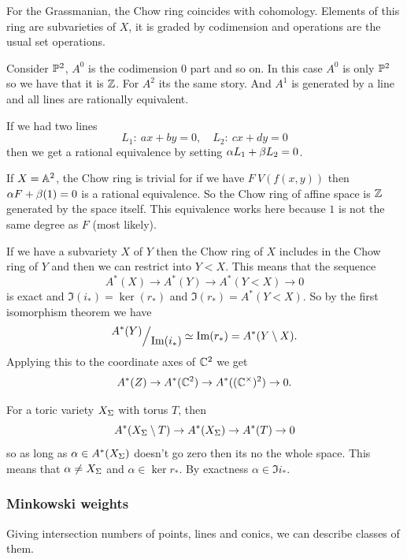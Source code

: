 \documentclass[12pt]{memoir}
\theoremstyle{definition}
\def\al{\alpha}
\begin{document}
For the Grassmanian, the Chow ring coincides with cohomology. Elements of this ring are subvarieties of $X$, it is graded by codimension and operations are the usual set operations.

\begin{Ex}
    Consider $\mathbb{P}^2$, $A^0$ is the codimension 0 part and so on. In this case $A^0$ is only $\mathbb{P}^2$ so we have that it is $\mathbb{Z}$. For $A^2$ its the same story. And $A^1$ is generated by a line and all lines are rationally equivalent.\par 
    If we had two lines 
    $$L_1:\ ax+by=0,\quad L_2:\ cx+dy=0$$
    then we get a rational equivalence by setting $\al L_1+\bt L_2=0$.
\end{Ex}

\begin{Ex}
    If $X=\mathbb{A}^2$, the Chow ring is trivial for if we have $F\: V(f(x,y))$ then $\al F+\bt(1)=0$ is a rational equivalence. So the Chow ring of affine space is $\mathbb{Z}$ generated by the space itself. This equivalence works here because $1$ is not the same degree as $F$ (most likely).
\end{Ex}

\begin{Ex}
    If we have a subvariety $X$ of $Y$ then the Chow ring of $X$ includes in the Chow ring of $Y$ and then we can restrict into $Y\less X$. This means that the sequence 
    $$A^*(X)\to A^*(Y)\to A^*(Y\less X)\to 0$$
    is exact and $\Im(i_\ast)=\ker(r_\ast)$ and $\Im(r_\ast)=A^\ast(Y\less X)$. So by the first isomorphism theorem we have 
    $$\quot{A^\ast(Y)}{\Im(i_\ast)}\isom \Im(r_\ast)=A^\ast(Y\less X).$$
    Applying this to the coordinate axes of $\mathbb{C}^2$ we get
    $$A^\ast(Z)\to A^\ast(\mathbb{C}^2)\to A^\ast((\mathbb{C}^\times)^2)\to 0.$$
\end{Ex}

\begin{Ex}
    For a toric variety $X_\Sigma$ with torus $T$, then 
    $$A^\ast(X_\Sigma\setminus T)\to A^\ast(X_\Sigma)\to A^\ast(T)\to 0$$
    so as long as $\al\in A^\ast(X_\Sg)$ doesn't go zero then its no the whole space. This means that $\al\neq X_\Sg$ and $\al\in\ker r_\ast$. By exactness $\al\in\Im i_\ast$.
\end{Ex}

\subsubsection{Minkowski weights}

Giving intersection numbers of points, lines and conics, we can describe classes of them. 
\end{document}
